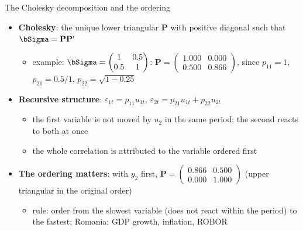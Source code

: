 \begin{frame}{The Cholesky decomposition and the ordering}
\itemsize{\small}
\begin{itemize}
    \item \textbf{Cholesky}: the unique lower triangular $\mathbf{P}$ with positive diagonal such that $\bSigma = \mathbf{P}\mathbf{P}'$
    \begin{itemize}
        \item example: $\bSigma = \begin{pmatrix} 1 & 0.5 \\ 0.5 & 1 \end{pmatrix}$: $\mathbf{P} = \begin{pmatrix} 1.000 & 0.000 \\ 0.500 & 0.866 \end{pmatrix}$, since $p_{11} = 1$, $p_{21} = 0.5/1$, $p_{22} = \sqrt{1 - 0.25}$
    \end{itemize}
    \item \textbf{Recursive structure}: $\varepsilon_{1t} = p_{11}u_{1t}$, $\varepsilon_{2t} = p_{21}u_{1t} + p_{22}u_{2t}$
    \begin{itemize}
        \item the first variable is not moved by $u_2$ in the same period; the second reacts to both at once
        \item the whole correlation is attributed to the variable ordered first
    \end{itemize}
    \item \textbf{The ordering matters}: with $y_2$ first, $\mathbf{P} = \begin{pmatrix} 0.866 & 0.500 \\ 0.000 & 1.000 \end{pmatrix}$ (upper triangular in the original order)
    \begin{itemize}
        \item rule: order from the slowest variable (does not react within the period) to the fastest; Romania: GDP growth, inflation, ROBOR
    \end{itemize}
\end{itemize}
\end{frame}

